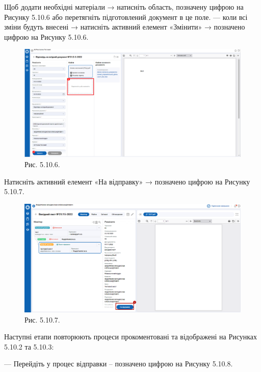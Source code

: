 Щоб додати необхідні матеріали → натисніть область, позначену цифрою
 на Рисунку 5.10.6 або перетягніть підготовлений документ в це поле.
--- коли всі зміни будуть внесені → натисніть активний елемент «Змінити» →
позначено цифрою  на Рисунку 5.10.6.

\begin{figure}[!htbp]
\centerline{\includegraphics[width=\textwidth]{img/5.10.6.png}}
\caption{Рис. 5.10.6. }
\end{figure}

Натисніть активний елемент «На відправку» → позначено цифрою  на Рисунку 5.10.7.

\begin{figure}[!htbp]
\centerline{\includegraphics[width=\textwidth]{img/5.10.7.png}}
\caption{Рис. 5.10.7. }
\end{figure}

\newpage
Наступні етапи повторюють процеси прокоментовані та відображені на Рисунках
5.10.2 та 5.10.3:

--- Перейдіть у процес відправки – позначено цифрою  на Рисунку 5.10.8.

